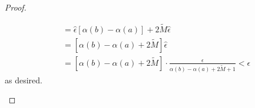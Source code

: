 \begin{proof}
\begin{enumerate}
\begin{align*}
                                                                                       &= \hat{\epsilon} [\alpha(b) - \alpha(a)] + 2 \tilde{M} \hat{\epsilon} \\
                                                                                       &= [\alpha(b) - \alpha(a) + 2 \tilde{M}] \hat{\epsilon} \\
                                                                                       &= [\alpha(b) - \alpha(a) + 2 \tilde{M}] \cdot \frac{ \epsilon }{ \alpha(b) - \alpha(a) + 2 \tilde{M} + 1  }  < \epsilon
            \end{align*}
            as desired.
    \end{enumerate}
\end{proof}

